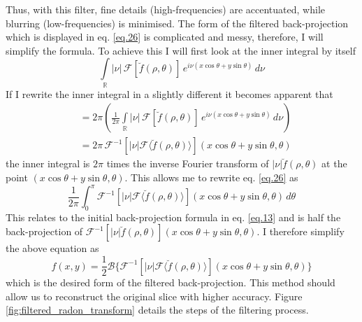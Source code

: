 \documentclass[12pt]{article}
\begin{document}
Thus, with this filter, fine details (high-frequencies) are accentuated, while blurring (low-frequencies) is minimised. The form of the filtered back-projection which is displayed in eq. \ref{eq.26} is complicated and messy, therefore, I will simplify the formula. To achieve this I will first look at the inner integral by itself
\begin{equation}\label{eq.27}
	\int\limits_{\mathbb{R}}|\nu|\,\mathcal{F}[\breve{f}(\rho, \theta)]\, e^{i\nu(x\cos{\theta}+y\sin{\theta})}\,d\nu
\end{equation}
If I  rewrite the inner integral in a slightly different it becomes apparent that
\begin{align}
	 &= 2\pi\left(\frac{1}{2\pi}\int\limits_{\mathbb{R}}|\nu|\,\mathcal{F}[\breve{f}(\rho, \theta)]\, e^{i\nu(x\cos{\theta}+y\sin{\theta})}\,d\nu\right)\label{eq.28} \\
	&= 2\pi \, \mathcal{F}^{-1}[|\nu|\mathcal{F}\langle\breve{f}(\rho, \theta)\rangle](x\cos{\theta} + y\sin{\theta}, \theta)\label{eq.29}
\end{align}
the inner integral is $2\pi$ times the inverse Fourier transform of $|\nu|\breve{f}(\rho, \theta)$ at the point $(x\cos{\theta}+y\sin{\theta}, \theta)$. This allows me to rewrite eq. \ref{eq.26} as
\begin{equation}\label{eq.30}
	\frac{1}{2\pi}\int_{0}^{\pi} \mathcal{F}^{-1}[|\nu|\mathcal{F}\langle\breve{f}(\rho, \theta)\rangle](x\cos{\theta} + y\sin{\theta}, \theta)\, d\theta
\end{equation}
This relates to the initial back-projection formula in eq. \ref{eq.13} and is half the back-projection of $\mathcal{F}^{-1}[|\nu|\breve{f}(\rho, \theta)](x\cos{\theta} + y\sin{\theta}, \theta)$. I therefore simplify the above equation as
\begin{equation}\label{eq.31}
	f(x,y)=\frac{1}{2}\mathcal{B} \{ \mathcal{F}^{-1}[|\nu|\mathcal{F}\langle\breve{f}(\rho, \theta)\rangle](x\cos{\theta} + y\sin{\theta}, \theta) \}
\end{equation}
which is the desired form of the filtered back-projection. This method should allow us to reconstruct the original slice with higher accuracy. Figure \ref{fig:filtered_radon_transform} details the steps of the filtering process.
\end{document}
